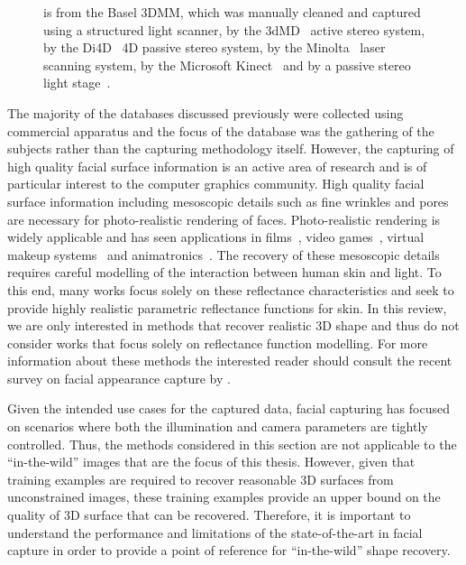 \begin{figure}[h]
{	          is from the Basel 3DMM, 
	         which was manually cleaned and captured using a structured light
	         scanner,  by the 
	         3dMD~\cite{3dmd} active stereo system, 
	          by the 
	         Di4D~\cite{di4d} 4D passive stereo system, 
	          by the 
	         Minolta~\cite{minolta} laser scanning system, 
	          by the 
	         Microsoft Kinect~\cite{zhang2012microsoft} and 
	          by a passive stereo 
	         light stage~\cite{debevec2000acquiring}.}
\label{fig:db_examples}
\end{figure}
The majority of the databases discussed previously were collected using
commercial apparatus and the focus of the database was the gathering of the
subjects rather than the capturing methodology itself. However, the capturing of
high quality facial surface information is an active area of research and is of
particular interest to the computer graphics community. High quality facial
surface information including mesoscopic details such as fine wrinkles and pores
are necessary for photo-realistic rendering of faces. Photo-realistic rendering
is widely applicable and has seen applications in
films~\cite{borshukov2005universal}, video games~\cite{vonderPahlen:2014kg},
virtual makeup systems~\cite{scherbaum2011computer} and
animatronics~\cite{jung2011believable}. The recovery of these mesoscopic details
requires careful modelling of the interaction between human skin and light. To
this end, many works focus solely on these reflectance characteristics and seek
to provide highly realistic parametric reflectance functions for skin. In this
review, we are only interested in methods that recover realistic 3D shape and
thus do not consider works that focus solely on reflectance function modelling.
For more information about these methods the interested reader should consult
the recent survey on facial appearance capture by \citet{Klehm:2015jb}.

Given the intended use cases for the captured data, facial capturing has focused
on scenarios where both the illumination and camera parameters are tightly
controlled. Thus, the methods considered in this section are not applicable
to the ``in-the-wild'' images that are the focus of this thesis. However,
given that training examples are required to recover reasonable 3D surfaces
from unconstrained images, these training examples provide an upper bound
on the quality of 3D surface that can be recovered. Therefore, it is important
to understand the performance and limitations of the state-of-the-art in 
facial capture in order to provide a point of reference for ``in-the-wild''
shape recovery.

